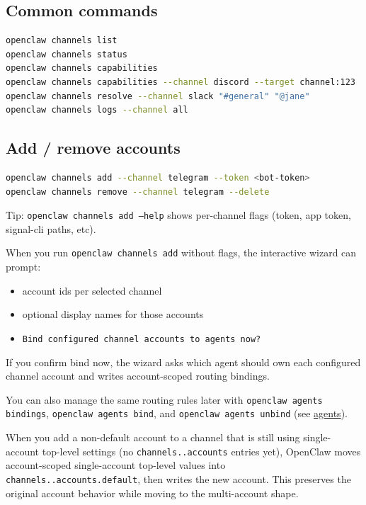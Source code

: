 \subsection{Common commands}


\begin{lstlisting}[language=bash]
openclaw channels list
openclaw channels status
openclaw channels capabilities
openclaw channels capabilities --channel discord --target channel:123
openclaw channels resolve --channel slack "#general" "@jane"
openclaw channels logs --channel all
\end{lstlisting}


\subsection{Add / remove accounts}


\begin{lstlisting}[language=bash]
openclaw channels add --channel telegram --token <bot-token>
openclaw channels remove --channel telegram --delete
\end{lstlisting}


Tip: \texttt{openclaw channels add --help} shows per-channel flags (token, app token, signal-cli paths, etc).

When you run \texttt{openclaw channels add} without flags, the interactive wizard can prompt:

\begin{itemize}
  \item account ids per selected channel
  \item optional display names for those accounts
  \item \texttt{Bind configured channel accounts to agents now?}
\end{itemize}


If you confirm bind now, the wizard asks which agent should own each configured channel account and writes account-scoped routing bindings.

You can also manage the same routing rules later with \texttt{openclaw agents bindings}, \texttt{openclaw agents bind}, and \texttt{openclaw agents unbind} (see \href{/cli/agents}{agents}).

When you add a non-default account to a channel that is still using single-account top-level settings (no \texttt{channels..accounts} entries yet), OpenClaw moves account-scoped single-account top-level values into \texttt{channels..accounts.default}, then writes the new account. This preserves the original account behavior while moving to the multi-account shape.

